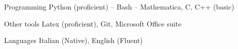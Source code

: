 


\begin{cvskills}


\cvskill
{Programming} %
{Python (proficient) -- Bash -- Mathematica, C, C++ (basic)} %


\cvskill
{Other tools} %
{Latex (proficient), Git, Microsoft Office suite} %


\cvskill
{Languages} %
{Italian (Native), English (Fluent)} %


\end{cvskills}